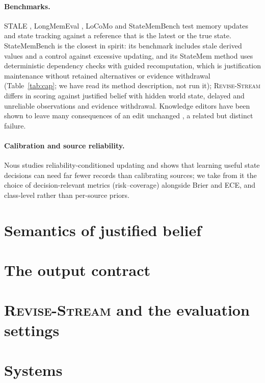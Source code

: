 \documentclass[11pt]{article}
\newcommand{\rs}{\textsc{Revise-Stream}}
\begin{document}
\paragraph{Benchmarks.} STALE \citep{stale2026}, LongMemEval \citep{longmemeval}, LoCoMo \citep{locomo2024} and StateMemBench \citep{statemembench2026} test memory updates and state tracking against a reference that is the latest or the true state. StateMemBench is the closest in spirit: its benchmark includes stale derived values and a control against excessive updating, and its StateMem method uses deterministic dependency checks with guided recomputation, which is justification maintenance without retained alternatives or evidence withdrawal (Table~\ref{tab:cap}; we have read its method description, not run it); \rs{} differs in scoring against justified belief with hidden world state, delayed and unreliable observations and evidence withdrawal. Knowledge editors have been shown to leave many consequences of an edit unchanged \citep{rippleedits}, a related but distinct failure.
\paragraph{Calibration and source reliability.} Nous \citep{nous2026a,nous2026b} studies reliability-conditioned updating and shows that learning useful state decisions can need far fewer records than calibrating sources; we take from it the choice of decision-relevant metrics (risk--coverage) alongside Brier and ECE, and class-level rather than per-source priors.

\section{Semantics of justified belief}\label{sec:semantics}


\section{The output contract}\label{sec:contract}


\section{\rs{} and the evaluation settings}\label{sec:benchmark}


\section{Systems}\label{sec:systems}

\end{document}
